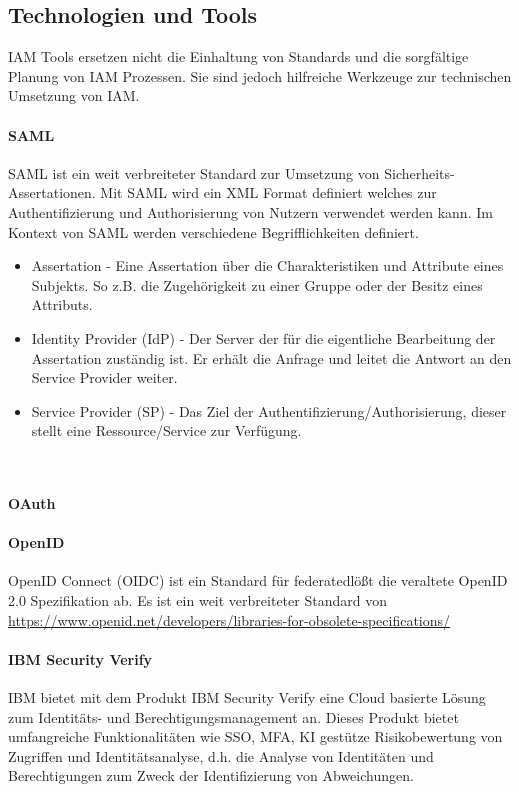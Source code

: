 \documentclass[10pt]{article}
\begin{document}
\subsection{Technologien und Tools}
IAM Tools ersetzen nicht die Einhaltung von Standards und die sorgfältige Planung von IAM Prozessen. Sie sind jedoch hilfreiche Werkzeuge zur technischen Umsetzung von IAM.
\paragraph{SAML}
SAML ist ein weit verbreiteter Standard zur Umsetzung von Sicherheits-Assertationen. Mit SAML wird ein XML Format definiert welches zur Authentifizierung und Authorisierung von Nutzern verwendet werden kann. Im Kontext von SAML werden verschiedene Begrifflichkeiten definiert.
\begin{itemize}
  \item Assertation - Eine Assertation über die Charakteristiken und Attribute eines Subjekts. So z.B. die Zugehörigkeit zu einer Gruppe oder der Besitz eines Attributs.
  \item Identity Provider (IdP) - Der Server der für die eigentliche Bearbeitung der Assertation zuständig ist. Er erhält die Anfrage und leitet die Antwort an den Service Provider weiter.
  \item Service Provider (SP) - Das Ziel der Authentifizierung/Authorisierung, dieser stellt eine Ressource/Service zur Verfügung.
\end{itemize}
~\cite{hughes2005security}
\paragraph{OAuth}

\paragraph{OpenID}
OpenID Connect (OIDC) ist ein Standard für federatedlößt die veraltete OpenID 2.0 Spezifikation ab. Es ist ein weit verbreiteter Standard von
\url{https://www.openid.net/developers/libraries-for-obsolete-specifications/}

\paragraph{IBM Security Verify}
IBM bietet mit dem Produkt \glqq{}IBM Security Verify\grqq{} eine Cloud basierte Lösung zum Identitäts- und Berechtigungsmanagement an. Dieses Produkt bietet umfangreiche Funktionalitäten wie SSO, MFA, KI gestütze Risikobewertung von Zugriffen und Identitätsanalyse, d.h. die Analyse von Identitäten und Berechtigungen zum Zweck der Identifizierung von Abweichungen.
\end{document}
